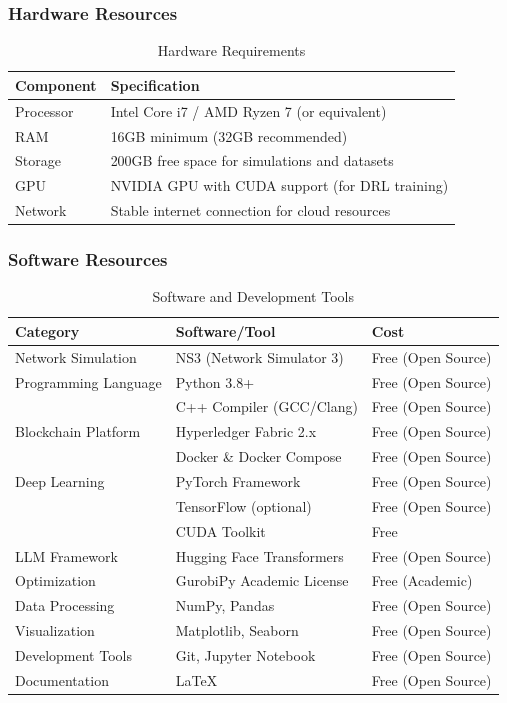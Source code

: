 \subsubsection{Hardware Resources}

\begin{table}[htbp]
\centering
\begin{tabular}{|l|l|}
\hline
\textbf{Component} & \textbf{Specification} \\
\hline
Processor & Intel Core i7 / AMD Ryzen 7 (or equivalent) \\
\hline
RAM & 16GB minimum (32GB recommended) \\
\hline
Storage & 200GB free space for simulations and datasets \\
\hline
GPU & NVIDIA GPU with CUDA support (for DRL training) \\
\hline
Network & Stable internet connection for cloud resources \\
\hline
\end{tabular}
\caption{Hardware Requirements}
\label{tab:hardware}
\end{table}

\subsubsection{Software Resources}

\begin{table}[htbp]
\centering
\begin{tabular}{|l|l|l|}
\hline
\textbf{Category} & \textbf{Software/Tool} & \textbf{Cost} \\
\hline
Network Simulation & NS3 (Network Simulator 3) & Free (Open Source) \\
\hline
Programming Language & Python 3.8+ & Free (Open Source) \\
\hline
& C++ Compiler (GCC/Clang) & Free (Open Source) \\
\hline
Blockchain Platform & Hyperledger Fabric 2.x & Free (Open Source) \\
\hline
& Docker \& Docker Compose & Free (Open Source) \\
\hline
Deep Learning & PyTorch Framework & Free (Open Source) \\
\hline
& TensorFlow (optional) & Free (Open Source) \\
\hline
& CUDA Toolkit & Free \\
\hline
LLM Framework & Hugging Face Transformers & Free (Open Source) \\
\hline
Optimization & GurobiPy Academic License & Free (Academic) \\
\hline
Data Processing & NumPy, Pandas & Free (Open Source) \\
\hline
Visualization & Matplotlib, Seaborn & Free (Open Source) \\
\hline
Development Tools & Git, Jupyter Notebook & Free (Open Source) \\
\hline
Documentation & LaTeX & Free (Open Source) \\
\hline
\end{tabular}
\caption{Software and Development Tools}
\label{tab:software}
\end{table}

